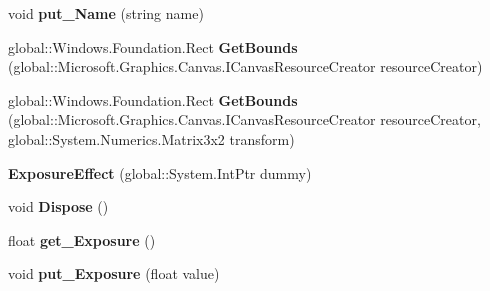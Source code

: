 \begin{DoxyCompactItemize}
void {\bfseries put\+\_\+\+Name} (string name)
\item 
\mbox{\label{class_microsoft_1_1_graphics_1_1_canvas_1_1_effects_1_1_exposure_effect_a1270050e057b25ed336629d9dbbe3c97}} 
global\+::\+Windows.\+Foundation.\+Rect {\bfseries Get\+Bounds} (global\+::\+Microsoft.\+Graphics.\+Canvas.\+I\+Canvas\+Resource\+Creator resource\+Creator)
\item 
\mbox{\label{class_microsoft_1_1_graphics_1_1_canvas_1_1_effects_1_1_exposure_effect_a0c2998bcc281563540602e5cd9876e4c}} 
global\+::\+Windows.\+Foundation.\+Rect {\bfseries Get\+Bounds} (global\+::\+Microsoft.\+Graphics.\+Canvas.\+I\+Canvas\+Resource\+Creator resource\+Creator, global\+::\+System.\+Numerics.\+Matrix3x2 transform)
\item 
\mbox{\label{class_microsoft_1_1_graphics_1_1_canvas_1_1_effects_1_1_exposure_effect_a71b4e6e4d796061fbe70e8dbafa96676}} 
{\bfseries Exposure\+Effect} (global\+::\+System.\+Int\+Ptr dummy)
\item 
\mbox{\label{class_microsoft_1_1_graphics_1_1_canvas_1_1_effects_1_1_exposure_effect_a073502db74a16a0bc3b88fd3e0feee8a}} 
void {\bfseries Dispose} ()
\item 
\mbox{\label{class_microsoft_1_1_graphics_1_1_canvas_1_1_effects_1_1_exposure_effect_a21127a47d22be5f3657dce651488a984}} 
float {\bfseries get\+\_\+\+Exposure} ()
\item 
\mbox{\label{class_microsoft_1_1_graphics_1_1_canvas_1_1_effects_1_1_exposure_effect_ae2886e4afaf9fb5cc87189bfa0b30600}} 
void {\bfseries put\+\_\+\+Exposure} (float value)
\item 
\mbox{\label{class_microsoft_1_1_graphics_1_1_canvas_1_1_effects_1_1_exposure_effect_a3a4a21d04c4c1e3ab6ff7ab1a75397c8}} 

\end{DoxyCompactItemize}
